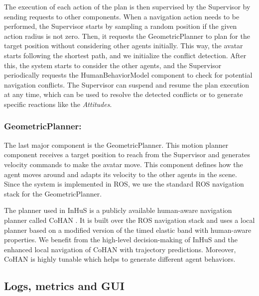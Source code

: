 The execution of each action of the plan is then supervised by the Supervisor by sending requests to other components. 
When a navigation action needs to be performed, the Supervisor starts by sampling a random position if the given action radius is not zero. Then, it requests the GeometricPlanner to plan for the target position without considering other agents initially. This way, the avatar starts following the shortest path, and we initialize the conflict detection. After this, the system starts to consider the other agents, and the Supervisor periodically requests the HumanBehaviorModel component to check for potential navigation conflicts. The Supervisor can suspend and resume the plan execution at any time, which can be used to resolve the detected conflicts or to generate specific reactions like the \textit{Attitudes}.

\subsubsection{GeometricPlanner:}

The last major component is the GeometricPlanner. This motion planner component receives a target position to reach from the Supervisor and generates velocity commands to make the avatar move. This component defines how the agent moves around and adapts its velocity to the other agents in the scene. Since the system is implemented in ROS, we use the standard ROS navigation stack for the GeometricPlanner.

The planner used in InHuS is a publicly available human-aware navigation planner called CoHAN \cite{singamaneni2021human}. It is built over the ROS navigation stack and uses a local planner based on a modified version of the timed elastic band with human-aware properties. 
We benefit from the high-level decision-making of InHuS and the enhanced local navigation of CoHAN with trajectory predictions. Moreover, CoHAN is highly tunable which helps to generate different agent behaviors. 

\subsection{Logs, metrics and GUI} \label{sec:logs_metrics}

